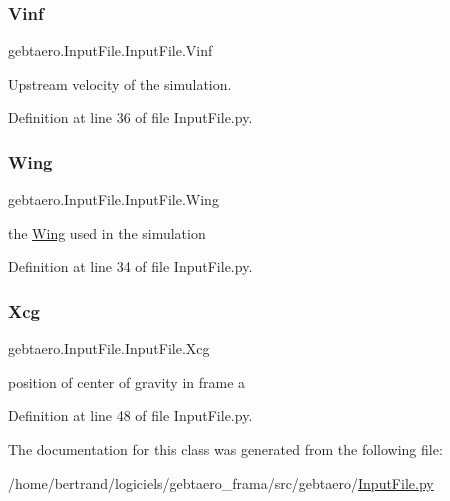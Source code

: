 \subsubsection{\texorpdfstring{Vinf}{Vinf}}
{\footnotesize\ttfamily gebtaero.\+Input\+File.\+Input\+File.\+Vinf}



Upstream velocity of the simulation. 



Definition at line 36 of file Input\+File.\+py.

\mbox{\label{classgebtaero_1_1_input_file_1_1_input_file_aef106e7014301b5094f9ebd82637f282}} 
\subsubsection{\texorpdfstring{Wing}{Wing}}
{\footnotesize\ttfamily gebtaero.\+Input\+File.\+Input\+File.\+Wing}



the \hyperlink{namespacegebtaero_1_1_wing}{Wing} used in the simulation 



Definition at line 34 of file Input\+File.\+py.

\mbox{\label{classgebtaero_1_1_input_file_1_1_input_file_a3e49397db5d15285d57c3df5311bf2f8}} 
\subsubsection{\texorpdfstring{Xcg}{Xcg}}
{\footnotesize\ttfamily gebtaero.\+Input\+File.\+Input\+File.\+Xcg}



position of center of gravity in frame a 



Definition at line 48 of file Input\+File.\+py.



The documentation for this class was generated from the following file\+:\begin{DoxyCompactItemize}
\item 
/home/bertrand/logiciels/gebtaero\+\_\+frama/src/gebtaero/\hyperlink{_input_file_8py}{Input\+File.\+py}\end{DoxyCompactItemize}
